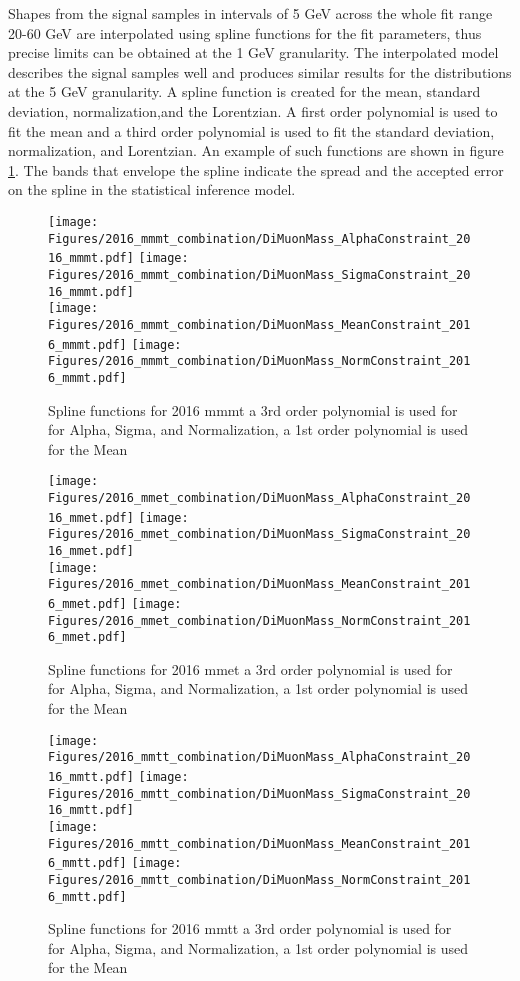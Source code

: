 Shapes from the signal samples in intervals of 5 GeV across the whole fit range 20-60 GeV are interpolated using spline functions for the fit parameters, thus precise limits can be obtained at the 1 GeV granularity. 
The interpolated model describes the signal samples well and produces similar results for the distributions at the 5 GeV granularity.  
A spline function is created for the mean, standard deviation, normalization,and the Lorentzian. 
A first order polynomial is used to fit the mean and a third order polynomial is used to fit the standard deviation, normalization, and Lorentzian. 
An example of such functions are shown in figure \ref{fig:spline_2016_mmmt}. The bands that envelope the spline indicate the spread and the accepted error on the spline in the statistical inference model.
\begin{figure}[ht!b]
    \centering 
    \texttt{[image: Figures/2016\_mmmt\_combination/DiMuonMass\_AlphaConstraint\_2016\_mmmt.pdf]}
    \texttt{[image: Figures/2016\_mmmt\_combination/DiMuonMass\_SigmaConstraint\_2016\_mmmt.pdf]}\\
    \texttt{[image: Figures/2016\_mmmt\_combination/DiMuonMass\_MeanConstraint\_2016\_mmmt.pdf]}
    \texttt{[image: Figures/2016\_mmmt\_combination/DiMuonMass\_NormConstraint\_2016\_mmmt.pdf]}\\
    \caption{\label{fig:spline_2016_mmmt} Spline functions for 2016 mmmt a 3rd order polynomial is used for  for Alpha, Sigma, and Normalization, a 1st order polynomial is used for the Mean}
\end{figure}
\begin{figure}[ht!b]
    \centering 
    \texttt{[image: Figures/2016\_mmet\_combination/DiMuonMass\_AlphaConstraint\_2016\_mmet.pdf]}
    \texttt{[image: Figures/2016\_mmet\_combination/DiMuonMass\_SigmaConstraint\_2016\_mmet.pdf]}\\
    \texttt{[image: Figures/2016\_mmet\_combination/DiMuonMass\_MeanConstraint\_2016\_mmet.pdf]}
    \texttt{[image: Figures/2016\_mmet\_combination/DiMuonMass\_NormConstraint\_2016\_mmet.pdf]}\\
    \caption{\label{fig:spline_2016_mmet} Spline functions for 2016 mmet a 3rd order polynomial is used for  for Alpha, Sigma, and Normalization, a 1st order polynomial is used for the Mean}
\end{figure}
\begin{figure}[ht!b]
    \centering 
    \texttt{[image: Figures/2016\_mmtt\_combination/DiMuonMass\_AlphaConstraint\_2016\_mmtt.pdf]}
    \texttt{[image: Figures/2016\_mmtt\_combination/DiMuonMass\_SigmaConstraint\_2016\_mmtt.pdf]}\\
    \texttt{[image: Figures/2016\_mmtt\_combination/DiMuonMass\_MeanConstraint\_2016\_mmtt.pdf]}
    \texttt{[image: Figures/2016\_mmtt\_combination/DiMuonMass\_NormConstraint\_2016\_mmtt.pdf]}\\
    \caption{\label{fig:spline_2016_mmtt} Spline functions for 2016 mmtt a 3rd order polynomial is used for  for Alpha, Sigma, and Normalization, a 1st order polynomial is used for the Mean}
\end{figure}
